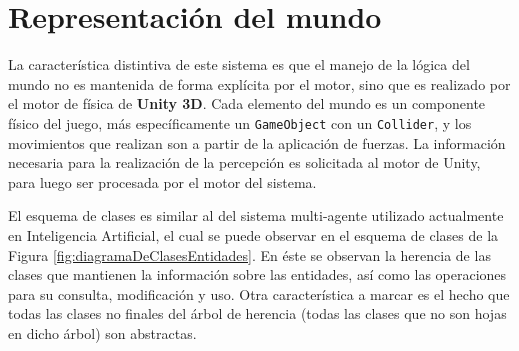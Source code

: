 \documentclass[a4paper,oneside]{article}
\begin{document}
% 
% 
% 
% 
% 
% 


\section{Representación del mundo} 

La característica distintiva de este sistema es que el manejo de la lógica del
mundo no es mantenida de forma explícita por el motor, sino que es realizado por
el motor de física de \textbf{Unity 3D}. 
Cada elemento del mundo es un componente físico del juego, más específicamente
un \texttt{GameObject} con un \texttt{Collider}, y los movimientos que realizan
son a partir de la aplicación de fuerzas. 
La información necesaria para la realización de la percepción es solicitada al
motor de Unity, para luego ser procesada por el motor del sistema.

El esquema de clases es similar al del sistema multi-agente utilizado
actualmente en Inteligencia Artificial, el cual se puede observar en el esquema
de clases de la Figura \ref{fig:diagramaDeClasesEntidades}. 
En éste se observan la herencia de las clases que mantienen la información sobre
las entidades, así como las operaciones para su consulta, modificación y uso.
Otra característica a marcar es el hecho que todas las clases no finales del
árbol de herencia (todas las clases que no son hojas en dicho árbol) son
abstractas.
\end{document}
